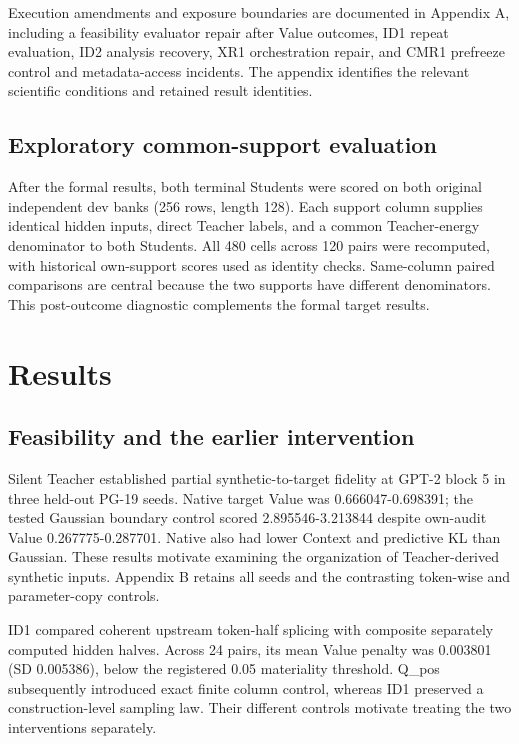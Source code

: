 Execution amendments and exposure boundaries are documented in Appendix A, including a feasibility evaluator repair after Value outcomes, ID1 repeat evaluation, ID2 analysis recovery, XR1 orchestration repair, and CMR1 prefreeze control and metadata-access incidents. The appendix identifies the relevant scientific conditions and retained result identities.

\subsection{Exploratory common-support evaluation}\label{exploratory-common-support-evaluation}

After the formal results, both terminal Students were scored on both original independent dev banks (256 rows, length 128). Each support column supplies identical hidden inputs, direct Teacher labels, and a common Teacher-energy denominator to both Students. All 480 cells across 120 pairs were recomputed, with historical own-support scores used as identity checks. Same-column paired comparisons are central because the two supports have different denominators. This post-outcome diagnostic complements the formal target results.

\section{Results}\label{results}

\subsection{Feasibility and the earlier intervention}\label{feasibility-and-the-earlier-intervention}

Silent Teacher established partial synthetic-to-target fidelity at GPT-2 block 5 in three held-out PG-19 seeds. Native target Value was 0.666047-0.698391; the tested Gaussian boundary control scored 2.895546-3.213844 despite own-audit Value 0.267775-0.287701. Native also had lower Context and predictive KL than Gaussian. These results motivate examining the organization of Teacher-derived synthetic inputs. Appendix B retains all seeds and the contrasting token-wise and parameter-copy controls.

ID1 compared coherent upstream token-half splicing with composite separately computed hidden halves. Across 24 pairs, its mean Value penalty was 0.003801 (SD 0.005386), below the registered 0.05 materiality threshold. Q\_pos subsequently introduced exact finite column control, whereas ID1 preserved a construction-level sampling law. Their different controls motivate treating the two interventions separately.

